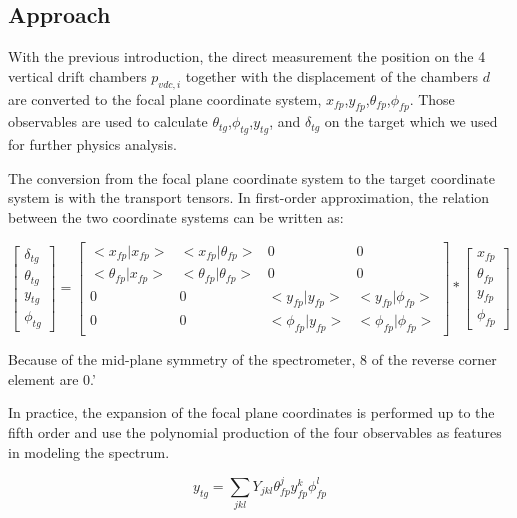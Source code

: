 \subsection{Approach}

With the previous introduction, the direct measurement the position on the 4 vertical drift chambers $p_{vdc,i}$ together with the displacement of the chambers $d$ are converted to the focal plane coordinate system, $x_{fp}$,$y_{fp}$,$\theta_{fp}$,$\phi_{fp}$. Those observables are used to calculate $\theta_{tg}$,$\phi_{tg}$,$y_{tg}$, and $\delta_{tg}$ on the target which we used for further physics analysis. 

The conversion from the focal plane coordinate system to the target coordinate system is with the transport tensors. In first-order approximation, the relation between the two coordinate systems can be written as:

\begin{equation}
\begin{bmatrix}
\delta_{tg} \\
\theta_{tg} \\
y_{tg} \\
\phi_{tg}
\end{bmatrix} = \begin{bmatrix}
    <x_{fp}|x_{fp}> & <x_{fp}|\theta_{fp}> & 0 & 0 \\
    <\theta_{fp}|x_{fp}> & <\theta_{fp}|\theta_{fp}> & 0 & 0 \\
    0 & 0 & <y_{fp}|y_{fp}> & <y_{fp}|\phi_{fp}>  \\
    0 & 0 & <\phi_{fp}|y_{fp}> & <\phi_{fp}|\phi_{fp}>  
\end{bmatrix} * \begin{bmatrix}
    x_{fp} \\
    \theta_{fp} \\
    y_{fp} \\
    \phi_{fp}
\end{bmatrix}
\end{equation}

Because of the mid-plane symmetry of the spectrometer, 8 of the reverse corner element are $0$.'


In practice, the expansion of the focal plane coordinates is performed up to the fifth order and use the polynomial production of the four observables as features in modeling the spectrum. 

\begin{equation}
    y_{tg} = \sum_{jkl}Y_{jkl}\theta^j_{fp}y^k_{fp}\phi^l_{fp}
\end{equation}


